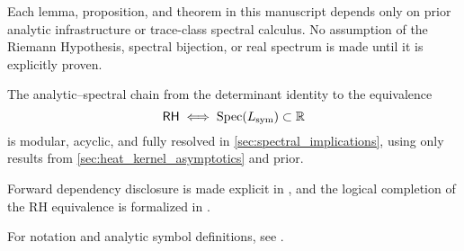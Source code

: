 Each lemma, proposition, and theorem in this manuscript depends only on prior analytic infrastructure or trace-class spectral calculus. No assumption of the Riemann Hypothesis, spectral bijection, or real spectrum is made until it is explicitly proven.

The analytic–spectral chain from the determinant identity to the equivalence
\[
\mathsf{RH} \iff \operatorname{Spec}(L_{\mathrm{sym}}) \subset \mathbb{R}
\]
is modular, acyclic, and fully resolved in \cref{sec:spectral_implications}, using only results from \cref{sec:heat_kernel_asymptotics} and prior.

Forward dependency disclosure is made explicit in , and the logical completion of the RH equivalence is formalized in .

For notation and analytic symbol definitions, see .
